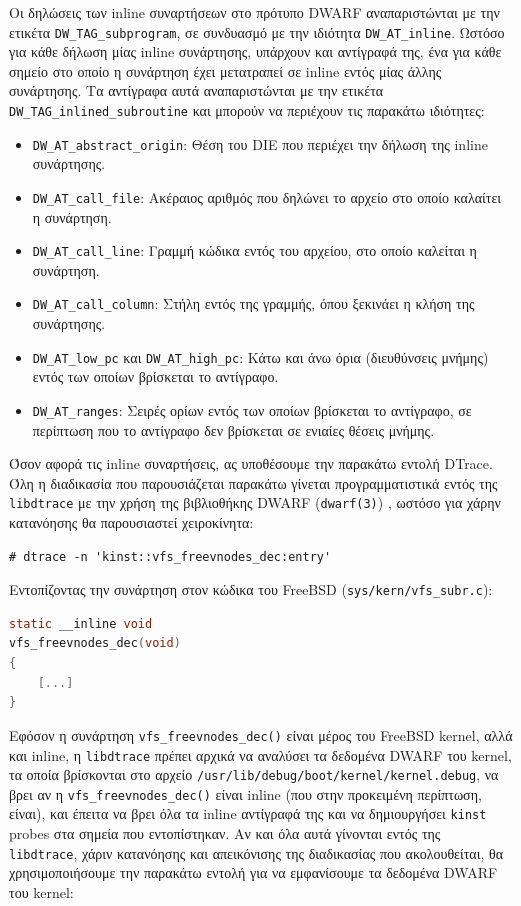 \documentclass[12pt]{article}
\begin{document}
Οι δηλώσεις των inline συναρτήσεων στο πρότυπο DWARF αναπαριστώνται με την
ετικέτα \lstinline{DW_TAG_subprogram}, σε συνδυασμό με την ιδιότητα
\lstinline{DW_AT_inline}. Ωστόσο για κάθε δήλωση μίας inline συνάρτησης,
υπάρχουν και αντίγραφά της, ένα για κάθε σημείο στο οποίο η συνάρτηση έχει
μετατραπεί σε inline εντός μίας άλλης συνάρτησης. Τα αντίγραφα αυτά
αναπαριστώνται με την ετικέτα \lstinline{DW_TAG_inlined_subroutine} και μπορούν
να περιέχουν τις παρακάτω ιδιότητες:

\begin{itemize}
	\item \lstinline{DW_AT_abstract_origin}: Θέση του DIE που περιέχει την
		δήλωση της inline συνάρτησης.
	\item \lstinline{DW_AT_call_file}: Ακέραιος αριθμός που δηλώνει το
		αρχείο στο οποίο καλαίτει η συνάρτηση.
	\item \lstinline{DW_AT_call_line}: Γραμμή κώδικα εντός του αρχείου, στο
		οποίο καλείται η συνάρτηση.
	\item \lstinline{DW_AT_call_column}: Στήλη εντός της γραμμής, όπου
		ξεκινάει η κλήση της συνάρτησης.
	\item \lstinline{DW_AT_low_pc} και \lstinline{DW_AT_high_pc}: Κάτω και
		άνω όρια (διευθύνσεις μνήμης) εντός των οποίων βρίσκεται το
		αντίγραφο.
	\item \lstinline{DW_AT_ranges}: Σειρές ορίων εντός των οποίων βρίσκεται
		το αντίγραφο, σε περίπτωση που το αντίγραφο δεν βρίσκεται σε
		ενιαίες θέσεις μνήμης.
\end{itemize}

Όσον αφορά τις inline συναρτήσεις, ας υποθέσουμε την παρακάτω εντολή DTrace.
Όλη η διαδικασία που παρουσιάζεται παρακάτω γίνεται προγραμματιστικά εντός της
\lstinline{libdtrace} με την χρήση της βιβλιοθήκης DWARF
(\lstinline{dwarf(3)}) \cite{margdwarf}, ωστόσο για χάρην κατανόησης θα παρουσιαστεί
χειροκίνητα:

\begin{lstlisting}
# dtrace -n 'kinst::vfs_freevnodes_dec:entry'
\end{lstlisting}

Εντοπίζοντας την συνάρτηση στον κώδικα του FreeBSD
(\lstinline{sys/kern/vfs_subr.c}):

\begin{lstlisting}[language=C]
static __inline void
vfs_freevnodes_dec(void)
{
	[...]
}
\end{lstlisting}

Εφόσον η συνάρτηση \lstinline{vfs_freevnodes_dec()} είναι μέρος του FreeBSD
kernel, αλλά και inline, η \lstinline{libdtrace} πρέπει αρχικά να αναλύσει τα
δεδομένα DWARF του kernel, τα οποία βρίσκονται στο αρχείο
\lstinline{/usr/lib/debug/boot/kernel/kernel.debug}, να βρει αν η
\lstinline{vfs_freevnodes_dec()} είναι inline (που στην προκειμένη περίπτωση,
είναι), και έπειτα να βρει όλα τα inline αντίγραφά της και να δημιουργήσει
\lstinline{kinst} probes στα σημεία που εντοπίστηκαν. Αν και όλα αυτά γίνονται
εντός της \lstinline{libdtrace}, χάριν κατανόησης και απεικόνισης της
διαδικασίας που ακολουθείται, θα χρησιμοποιήσουμε την παρακάτω εντολή για να
εμφανίσουμε τα δεδομένα DWARF του kernel:
\end{document}
